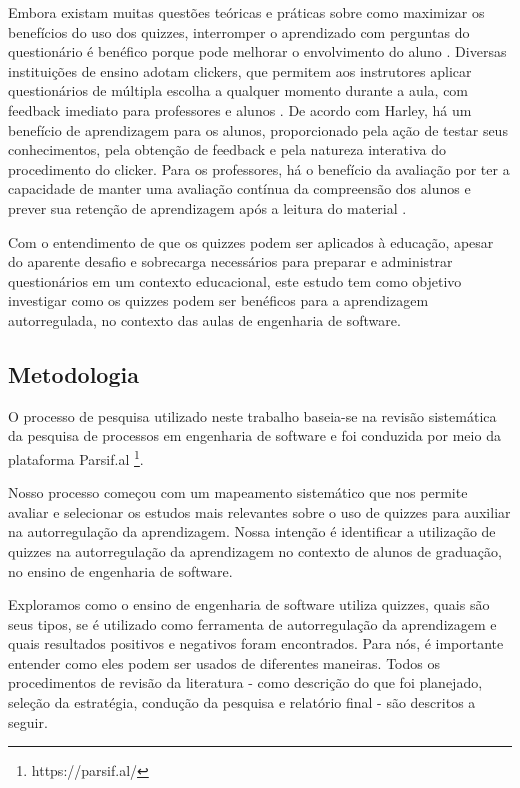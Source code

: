 Embora existam muitas questões teóricas e práticas sobre como maximizar os benefícios do uso dos quizzes, interromper o aprendizado com perguntas do questionário é benéfico porque pode melhorar o envolvimento do aluno \cite{healy_timing_2017}. Diversas instituições de ensino adotam clickers, que permitem aos instrutores aplicar questionários de múltipla escolha a qualquer momento durante a aula, com feedback imediato para professores e alunos \cite{smith_why_2009}. De acordo com Harley, há um benefício de aprendizagem para os alunos, proporcionado pela ação de testar seus conhecimentos, pela obtenção de feedback e pela natureza interativa do procedimento do clicker. Para os professores, há o benefício da avaliação por ter a capacidade de manter uma avaliação contínua da compreensão dos alunos e prever sua retenção de aprendizagem após a leitura do material \cite{healy_timing_2017}.

Com o entendimento de que os quizzes podem ser aplicados à educação, apesar do aparente desafio e sobrecarga necessários para preparar e administrar questionários em um contexto educacional, este estudo tem como objetivo investigar como os quizzes podem ser benéficos para a aprendizagem autorregulada, no contexto das aulas de engenharia de software.

\subsection{Metodologia}
\label{metodo}

O processo de pesquisa utilizado neste trabalho baseia-se na revisão sistemática da pesquisa de processos em engenharia de software \cite{kitchenham_systematic_2013, kitchenham_systematic_2009} e foi conduzida por meio da plataforma Parsif.al \footnote{https://parsif.al/}.

Nosso processo começou com um mapeamento sistemático que nos permite avaliar e selecionar os estudos mais relevantes sobre o uso de quizzes para auxiliar na autorregulação da aprendizagem. Nossa intenção é identificar a utilização de quizzes na autorregulação da aprendizagem no contexto de alunos de graduação, no ensino de engenharia de software.

Exploramos como o ensino de engenharia de software utiliza quizzes, quais são seus tipos, se é utilizado como ferramenta de autorregulação da aprendizagem e quais resultados positivos e negativos foram encontrados. Para nós, é importante entender como eles podem ser usados de diferentes maneiras. Todos os procedimentos de revisão da literatura - como descrição do que foi planejado, seleção da estratégia, condução da pesquisa e relatório final - são descritos a seguir.

